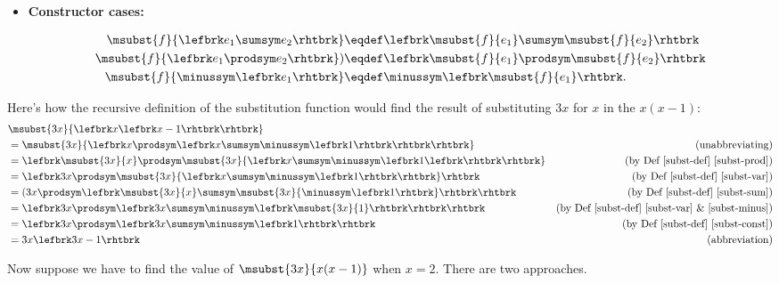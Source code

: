 \begin{definition}
\begin{definition}
\begin{itemize}
\item \textbf{Constructor cases:}


\begin{align*}
\label{subst-sum}
\msubst{f}{\lefbrk e_1 \sumsym e_2\rhtbrk} & \eqdef  \lefbrk \msubst{f}{e_1} \sumsym
\msubst{f}{e_2}\rhtbrk\\
\label{subst-prod} 
\msubst{f}{\lefbrk e_1 \prodsym e_2\rhtbrk}) & \eqdef  \lefbrk \msubst{f}{e_1} \prodsym
\msubst{f}{e_2}\rhtbrk\\
\label{subst-minus} 
\msubst{f}{\minussym\lefbrk e_1\rhtbrk} & \eqdef \minussym \lefbrk \msubst{f}{e_1}\rhtbrk.
\end{align*}
\end{itemize}
\end{definition}

Here's how the recursive definition of the substitution function would find
the result of substituting $3x$ for $x$ in the $x(x-1)$:
\begin{align*}
\lefteqn{\msubst{3x}{\lefbrk x\lefbrk x-1\rhtbrk\rhtbrk}}\\
 & =
\msubst{3x}{\lefbrk x \prodsym \lefbrk x \sumsym \minussym\lefbrk 1 \rhtbrk \rhtbrk \rhtbrk} & \text{(unabbreviating)}\\
 & =\lefbrk \msubst{3x}{x} \prodsym \msubst{3x}{\lefbrk x \sumsym \minussym
\lefbrk 1 \lefbrk \rhtbrk \rhtbrk}
         & \text{(by~Def~\ref{subst-def}~\ref{subst-prod})}\\
 & = \lefbrk 3x \prodsym \msubst{3x}{\lefbrk x \sumsym \minussym\lefbrk 1 \rhtbrk \rhtbrk} \rhtbrk
         & \text{(by~Def~\ref{subst-def}~\ref{subst-var})}\\
 & = (3x \prodsym \lefbrk \msubst{3x}{x} \sumsym \msubst{3x}{\minussym\lefbrk 1 \rhtbrk} \rhtbrk \rhtbrk
         & \text{(by~Def~\ref{subst-def}~\ref{subst-sum})}\\
 & = \lefbrk 3x \prodsym \lefbrk 3x \sumsym \minussym \lefbrk \msubst{3x}{1} \rhtbrk \rhtbrk \rhtbrk
         & \text{(by~Def~\ref{subst-def}~\ref{subst-var} \&~\ref{subst-minus})}\\
 & = \lefbrk 3x \prodsym \lefbrk 3x \sumsym \minussym \lefbrk 1\rhtbrk \rhtbrk
         & \text{(by~Def~\ref{subst-def}~\ref{subst-const})}\\
 & = 3x\lefbrk 3x-1 \rhtbrk & \text{(abbreviation)}
\end{align*}

Now suppose we have to find the value of $\msubst{3x}{x(x-1)}$ when $x =
2$.  There are two approaches.


\end{definition}
